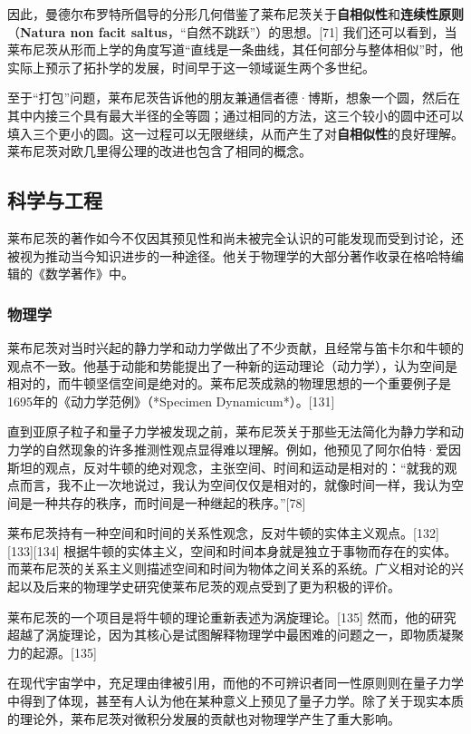 因此，曼德尔布罗特所倡导的分形几何借鉴了莱布尼茨关于\textbf{自相似性}和\textbf{连续性原则}（\textbf{Natura non facit saltus}，“自然不跳跃”）的思想。[71] 我们还可以看到，当莱布尼茨从形而上学的角度写道“直线是一条曲线，其任何部分与整体相似”时，他实际上预示了拓扑学的发展，时间早于这一领域诞生两个多世纪。  

至于“打包”问题，莱布尼茨告诉他的朋友兼通信者德·博斯，想象一个圆，然后在其中内接三个具有最大半径的全等圆；通过相同的方法，这三个较小的圆中还可以填入三个更小的圆。这一过程可以无限继续，从而产生了对\textbf{自相似性}的良好理解。莱布尼茨对欧几里得公理的改进也包含了相同的概念。
\subsection{科学与工程}  
莱布尼茨的著作如今不仅因其预见性和尚未被完全认识的可能发现而受到讨论，还被视为推动当今知识进步的一种途径。他关于物理学的大部分著作收录在格哈特编辑的《数学著作》中。
\subsubsection{物理学}  
莱布尼茨对当时兴起的静力学和动力学做出了不少贡献，且经常与笛卡尔和牛顿的观点不一致。他基于动能和势能提出了一种新的运动理论（动力学），认为空间是相对的，而牛顿坚信空间是绝对的。莱布尼茨成熟的物理思想的一个重要例子是1695年的《动力学范例》（*Specimen Dynamicum*）。[131]  

直到亚原子粒子和量子力学被发现之前，莱布尼茨关于那些无法简化为静力学和动力学的自然现象的许多推测性观点显得难以理解。例如，他预见了阿尔伯特·爱因斯坦的观点，反对牛顿的绝对观念，主张空间、时间和运动是相对的：“就我的观点而言，我不止一次地说过，我认为空间仅仅是相对的，就像时间一样，我认为空间是一种共存的秩序，而时间是一种继起的秩序。”[78]  

莱布尼茨持有一种空间和时间的关系性观念，反对牛顿的实体主义观点。[132][133][134] 根据牛顿的实体主义，空间和时间本身就是独立于事物而存在的实体。而莱布尼茨的关系主义则描述空间和时间为物体之间关系的系统。广义相对论的兴起以及后来的物理学史研究使莱布尼茨的观点受到了更为积极的评价。

莱布尼茨的一个项目是将牛顿的理论重新表述为涡旋理论。[135] 然而，他的研究超越了涡旋理论，因为其核心是试图解释物理学中最困难的问题之一，即物质凝聚力的起源。[135]  

在现代宇宙学中，充足理由律被引用，而他的不可辨识者同一性原则则在量子力学中得到了体现，甚至有人认为他在某种意义上预见了量子力学。除了关于现实本质的理论外，莱布尼茨对微积分发展的贡献也对物理学产生了重大影响。


